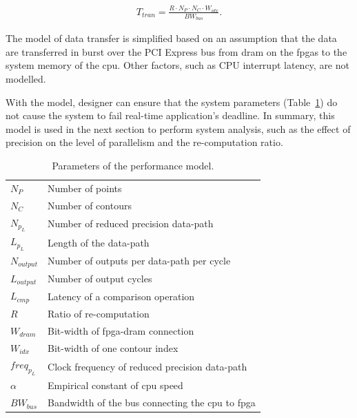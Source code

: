 \begin{equation}
\begin{aligned}
T_{tran} = \frac{R \cdot N_P \cdot N_C \cdot W_{idx}}{BW_{bus}} \mbox{.}
\end{aligned}
\label{eqt:tran}
\end{equation}

The model of data transfer is simplified based on an assumption that the data are transferred in burst over the PCI Express bus from \gls{dram} on the \glspl{fpga} to the system memory of the \gls{cpu}.
Other factors, such as CPU interrupt latency, are not modelled.

With the model, designer can ensure that the system parameters (Table~\ref{tab:model}) do not cause the system to fail real-time application's deadline.
In summary, this model is used in the next section to perform system analysis, such as the effect of precision on the level of parallelism and the re-computation ratio.

\begin{table}[t!]
	\begin{spacing}{1.0}
	\caption{Parameters of the performance model.}
	\label{tab:model}
	\centering
	\smallskip
	\begin{tabular}{l|l}
			\hline
			$N_P$			& Number of points \\
			$N_C$			& Number of contours \\
			$N_{p_L}$ 		& Number of reduced precision data-path \\
			$L_{p_L}$			& Length of the data-path \\
			$N_{output}$ 	& Number of outputs per data-path per cycle \\
			$L_{output}$ 	& Number of output cycles \\
			$L_{cmp}$			& Latency of a comparison operation \\
			$R$ 			& Ratio of re-computation \\
			$W_{dram}$ 		& Bit-width of \gls{fpga}-\gls{dram} connection \\
			$W_{idx}$ 		& Bit-width of one contour index \\
			$freq_{p_L}$  	& Clock frequency of reduced precision data-path \\
			$\alpha$ 		& Empirical constant of \gls{cpu} speed \\
			$BW_{bus}$ 	& Bandwidth of the bus connecting the \gls{cpu} to \gls{fpga} \\
			\hline
		\end{tabular}
	\end{spacing}
\end{table}

